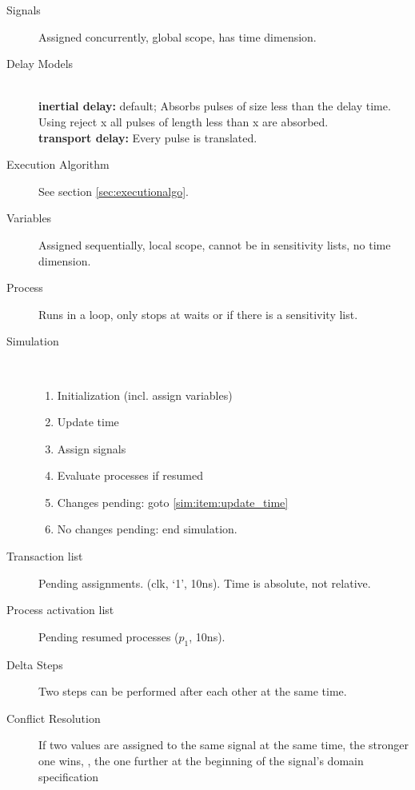 \begin{description}
	\item[Signals] Assigned concurrently, global scope, has time dimension.
	\item[Delay Models] \ \\
	\textbf{inertial delay:} default; Absorbs pulses of size
	less than the delay time. Using reject x all pulses of length less than x are
	absorbed. \\
	\textbf{transport delay:} Every pulse is translated.
	\item[Execution Algorithm] See section \ref{sec:executionalgo}.
	\item[Variables] Assigned sequentially, local scope, cannot be in sensitivity
	lists, no time dimension.
	\item[Process] Runs in a loop, only stops at waits or if there is a sensitivity
	list.
	\item[Simulation] \ 
	\begin{enumerate}
		\item Initialization (incl. assign variables)
		\item \label{sim:item:update_time}Update time
		\item Assign signals
		\item Evaluate processes if resumed
		\item Changes pending: goto \ref{sim:item:update_time}
		\item No changes pending: end simulation.
	\end{enumerate}
	\item[Transaction list] Pending assignments. 
	(clk, `1', 10ns). Time is absolute, not relative.
	\item[Process activation list] Pending resumed processes ($p_1$, 10ns).
	\item[Delta Steps] Two steps can be performed after each other at the same
	time.
	\item[Conflict Resolution] If two values are assigned to the same signal at the
	same time, the stronger one wins, \ie, the one further at the beginning of the
	signal's domain specification
\end{description}

